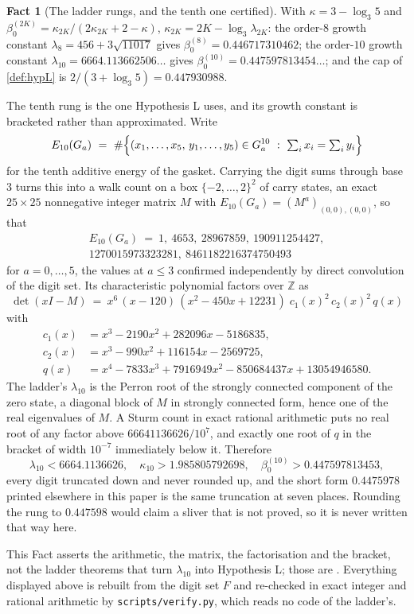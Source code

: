 \documentclass[11pt]{amsart}
\theoremstyle{definition}
\newtheorem{fact}[theorem]{Fact}
\theoremstyle{remark}
\begin{document}
\begin{fact}[The ladder rungs, and the tenth one certified]
\label{fact:ladder}
With $\kappa = 3 - \log_3 5$ and $\beta_0^{(2K)} = \kappa_{2K} / (2\kappa_{2K} + 2 - \kappa)$, $\kappa_{2K} = 2K - \log_3\lambda_{2K}$:
the order-$8$ growth constant $\lambda_8 = 456 + 3\sqrt{11017}$ gives $\beta_0^{(8)} = 0.446717310462$;
the order-$10$ growth constant $\lambda_{10} = 6664.113662506\ldots$ gives $\beta_0^{(10)} = 0.447597813454\ldots$;
and the cap of \cref{def:hypL} is $2/(3 + \log_3 5) = 0.447930988$.

The tenth rung is the one Hypothesis L uses, and its growth constant is bracketed rather than approximated. Write
\[
  E_{10}(G_a) \ = \ \#\Bigl\{ (x_1,\dots,x_5,\,y_1,\dots,y_5) \in G_a^{10} \ : \ \textstyle\sum_i x_i = \sum_i y_i \Bigr\}
\]
for the tenth additive energy of the gasket. Carrying the digit sums through base $3$ turns this into a walk count on a box $\{-2,\dots,2\}^2$ of carry states, an exact $25 \times 25$ nonnegative integer matrix $M$ with $E_{10}(G_a) = (M^a)_{(0,0),(0,0)}$, so that
\begin{gather*}
  E_{10}(G_a) \ = \ 1,\ 4653,\ 28967859,\ 190911254427, \\
  1270015973323281,\ 8461182216374750493
\end{gather*}
for $a = 0,\dots,5$, the values at $a \le 3$ confirmed independently by direct convolution of the digit set. Its characteristic polynomial factors over $\mathbb Z$ as
\[
  \det(xI - M) \ = \ x^6\,(x-120)\,(x^2-450x+12231)\; c_1(x)^2\, c_2(x)^2\, q(x)
\]
with
\begin{align*}
  c_1(x) &= x^3-2190x^2+282096x-5186835, \\
  c_2(x) &= x^3-990x^2+116154x-2569725, \\
  q(x) &= x^4 - 7833x^3 + 7916949x^2 - 850684437x + 13054946580 .
\end{align*}
The ladder's $\lambda_{10}$ is the Perron root of the strongly connected component of the zero state, a diagonal block of $M$ in strongly connected form, hence one of the real eigenvalues of $M$. A Sturm count in exact rational arithmetic puts no real root of any factor above $66641136626/10^{7}$, and exactly one root of $q$ in the bracket of width $10^{-7}$ immediately below it. Therefore
\[
  \lambda_{10} < 6664.1136626, \quad \kappa_{10} > 1.985805792698, \quad \beta_0^{(10)} > 0.447597813453 ,
\]
every digit truncated down and never rounded up, and the short form $0.4475978$ printed elsewhere in this paper is the same truncation at seven places. Rounding the rung to $0.447598$ would claim a sliver that is not proved, so it is never written that way here.

This Fact asserts the arithmetic, the matrix, the factorisation and the bracket, not the ladder theorems that turn $\lambda_{10}$ into Hypothesis L; those are \cite{ladder}. Everything displayed above is rebuilt from the digit set $F$ and re-checked in exact integer and rational arithmetic by \texttt{scripts/verify.py}, which reads no code of the ladder's.
\end{fact}
\end{document}
